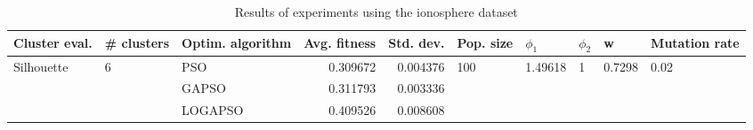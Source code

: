 \begin{table}
\centering
\caption{Results of experiments using the ionosphere dataset}
\begin{tabular}{lllrrlllll}
\toprule
              Cluster eval. &        \# clusters & Optim. algorithm &  Avg. fitness &  Std. dev. &            Pop. size &               $\phi_{1}$ &         $\phi_{2}$ &                       w &         Mutation rate \\
\midrule
\multirow{3}{*}{Silhouette} & \multirow{3}{*}{6} &              PSO &      0.309672 &   0.004376 & \multirow{3}{*}{100} & \multirow{3}{*}{1.49618} & \multirow{3}{*}{1} & \multirow{3}{*}{0.7298} & \multirow{3}{*}{0.02} \\
                            &                    &            GAPSO &      0.311793 &   0.003336 &                      &                          &                    &                         &                       \\
                            &                    &          LOGAPSO &      0.409526 &   0.008608 &                      &                          &                    &                         &                       \\
\bottomrule
\end{tabular}
\end{table}
